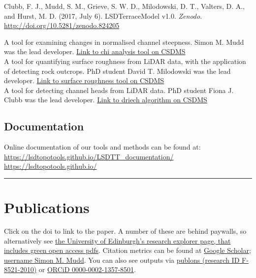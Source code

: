 \documentclass[10pt, a4paper]{article}
\newcommand{\years}[1]{\marginnote{\scriptsize #1}}
\begin{document}
Clubb, F. J., Mudd, S. M., Grieve, S. W. D., Milodowski, D. T., Valters, D. A., and Hurst, M. D. (2017, July 6). LSDTerraceModel v1.0. \textit{Zenodo}.\\ \href{http://doi.org/10.5281/zenodo.824205}{http://doi.org/10.5281/zenodo.824205}\par



\years{CSDMS}A tool for examining changes in normalised channel steepness. Simon M. Mudd was the lead developer. \href{http://csdms.colorado.edu/wiki/Model:Chi_analysis_tools}{Link to chi analysis tool on CSDMS}\\[0.05cm]
A tool for quantifying surface roughness from LiDAR data, with the application of detecting rock outcrops. PhD student David T. Milodowski was the lead developer. \href{http://csdms.colorado.edu/wiki/Model:SurfaceRoughness}{Link to surface roughness tool on CSDMS}\\[0.05cm]
A tool for detecting channel heads from LiDAR data. PhD student Fiona J. Clubb was the lead developer. \href{http://csdms.colorado.edu/wiki/Model:DrEICH_algorithm}{Link to driech algorithm on CSDMS}\\[0.05cm]

\subsection*{Documentation}Online documentation of our tools and methods can be found at:\\[0.05cm]
\url{https://lsdtopotools.github.io/LSDTT_documentation/}\\[0.05cm]
\url{https://lsdtopotools.github.io/}\\[0.05cm]

\hrule
\section*{Publications}
Click on the doi to link to the paper. 
A number of these are behind paywalls, so alternatively see \href{https://www.research.ed.ac.uk/portal/en/persons/simon-mudd(597e4975-68c0-4175-8119-0d22d1438753).html}{the University of Edinburgh’s research explorer page, that includes green open access pdfs}. 
Citation metrics can be found at \href{http://scholar.google.com/citations?user=9iv6l7wAAAAJ\&hl=en}{Google Scholar; username Simon M. Mudd}. 
You can also see outputs via \href{https://publons.com/researcher/2825683/simon-m-mudd/}{publons (research ID F-8521-2010)} or \href{https://orcid.org/0000-0002-1357-8501}{ORCiD 0000-0002-1357-8501}.
\end{document}
